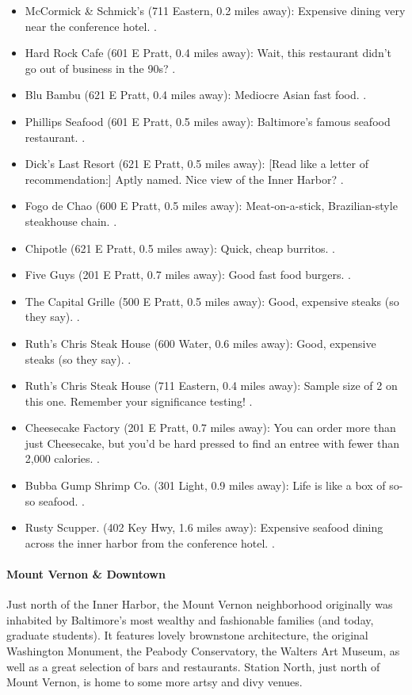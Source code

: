 \begin{itemize}
\item{McCormick \& Schmick's (711 Eastern, 0.2 miles away): Expensive dining very near the conference hotel. \professor.}
\item{Hard Rock Cafe (601 E Pratt, 0.4 miles away): Wait, this restaurant didn't go out of business in the 90s? \postdoc.}
\item{Blu Bambu (621 E Pratt, 0.4 miles away): Mediocre Asian fast food. \postdoc.}
\item{Phillips Seafood (601 E Pratt, 0.5 miles away): Baltimore's famous seafood restaurant. \professor.}
\item{Dick's Last Resort (621 E Pratt, 0.5 miles away): [Read like a letter of recommendation:] Aptly named. Nice view of the Inner Harbor? \postdoc.}
\item{Fogo de Chao (600 E Pratt, 0.5 miles away): Meat-on-a-stick, Brazilian-style steakhouse chain. \professor.}
\item{Chipotle (621 E Pratt, 0.5 miles away): Quick, cheap burritos. \gradstudent.}
\item{Five Guys (201 E Pratt, 0.7 miles away): Good fast food burgers. \gradstudent.}
\item{The Capital Grille (500 E Pratt, 0.5 miles away): Good, expensive steaks (so they say). \industry.}
\item{Ruth's Chris Steak House (600 Water, 0.6 miles away): Good, expensive steaks (so they say). \industry.}
\item{Ruth's Chris Steak House (711 Eastern, 0.4 miles away): Sample size of 2 on this one. Remember your significance testing! \industry.}
\item{Cheesecake Factory (201 E Pratt, 0.7 miles away): You can order more than just Cheesecake, but you'd be hard pressed to find an entree with fewer than 2,000 calories. \postdoc.}
\item{Bubba Gump Shrimp Co. (301 Light, 0.9 miles away): Life is like a box of so-so seafood. \postdoc.}
\item{Rusty Scupper. (402 Key Hwy, 1.6 miles away): Expensive seafood
  dining across the inner harbor from the conference hotel. \professor.}
\end{itemize}


\paragraph*{Mount Vernon \& Downtown} 
Just north of the Inner Harbor, the Mount Vernon neighborhood originally was inhabited by Baltimore's most wealthy and fashionable families (and today, graduate students). It features lovely brownstone architecture, the original Washington Monument, the Peabody Conservatory, the Walters Art Museum, as well as a great selection of bars and restaurants. Station North, just north of Mount Vernon, is home to some more artsy and divy venues.

